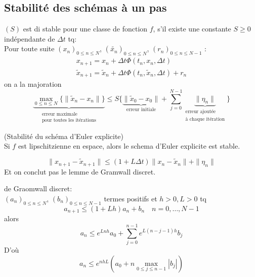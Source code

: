 \subsection{Stabilité des schémas à un pas}
\begin{definition}
    $(S)$ est di stable pour une classe de fonction  $f$, s'il existe une constante  $S \ge 0$ indépendante de $\Delta t$ tq:\\
    Pour toute suite  $(x_n)_{0 \le n \le N}$, $(\tilde{x_n})_{0 \le n \le N}$, $(r_n)_{0 \le n \le N-1}$ :
    \begin{align*}
        x_{n+1} = x_n + \Delta t \Phi(t_n, x_n, \Delta t)\\
        \tilde{x}_{n+1} = \tilde{x}_n + \Delta t \Phi(t_n, \tilde{x}_{n}, \Delta t) + r_n
    \end{align*}
    on a la majoration 
    \[
        \underbrace{\max_{0 \le n \le N} \{ \|\tilde{x}_n - x_n\|  \}}_{\substack{\text{erreur maximale}\\ \text{pour toutes les itérations}}} \le S \{ \underbrace{\|\tilde{x}_0 - x_0\|}_{\text{erreur initiale}} + \sum_{j=0}^{N-1} \underbrace{\|\eta_n\|}_{\substack{\text{erreur ajoutée}\\ \text{à chaque itération}}} \}
    \] 
\end{definition}
\begin{prop}
    (Stabilité du schéma d'Euler explicite) \\ 
    Si $f$ est lipschitzienne en espace, alors le schema d'Euler explicite est stable.
\end{prop}
\begin{preuve}
    \[
        \|x_{n+1} - \tilde{x}_{n+1}\| \le (1 + L\Delta t) \|x_n - \tilde{x}_n\| + \|\eta_n\|
    \] 
    Et on conclut pas le lemme de Gramwall discret.
\end{preuve}
\begin{lemma}
   de Graomwall discret:\\  
   $(a_n)_{0 \le n \le N}$, $(b_n)_{0 \le n \le N-1}$ termes positifs et $h > 0, L > 0$ tq
    \[
   a_{n+1} \le (1 + Lh)a_n + b_n \quad n = 0, \ldots, N-1
   \] 
   alors
   \[
       a_n \le e^{Lnh} a_0 + \sum_{j=0}^{n-1} e^{L(n - j - 1)h}b_j
   \] 
   D'où
   \[
       a_n \le e^{nhL}(a_0 + n\max_{0 \le j \le n-1}|b_j|)
   \] 
\end{lemma}
